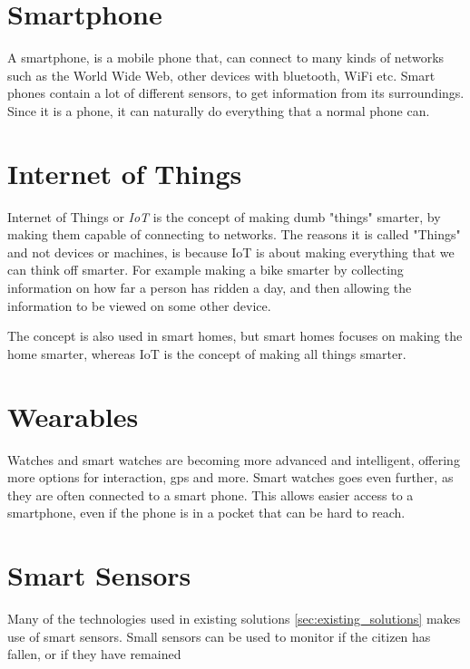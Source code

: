 \section*{Smartphone}
A smartphone, is a mobile phone that, can connect to many kinds of networks such as the World Wide Web, other devices with bluetooth, WiFi etc. Smart phones contain a lot of different sensors, to get information from its surroundings. Since it is a phone, it can naturally do everything that a normal phone can. 


\section*{Internet of Things}
Internet of Things or \textit{IoT} is the concept of making dumb "things" smarter, by making them capable of connecting to networks. The reasons it is called "Things" and not devices or machines, is because IoT is about making everything that we can think off smarter. For example making a bike smarter by collecting information on how far a person has ridden a day, and then allowing the information to be viewed on some other device.

The concept is also used in smart homes, but smart homes focuses on making the home smarter, whereas IoT is the concept of making all things smarter.


\section*{Wearables}
Watches and smart watches are becoming more advanced and intelligent, offering more options for interaction, gps and more. Smart watches goes even further, as they are often connected to a smart phone. This allows easier access to a smartphone, even if the phone is in a pocket that can be hard to reach.

\section*{Smart Sensors}
Many of the technologies used in existing solutions \ref{sec:existing_solutions} makes use of smart sensors. Small sensors can be used to monitor if the citizen has fallen, or if they have remained 


